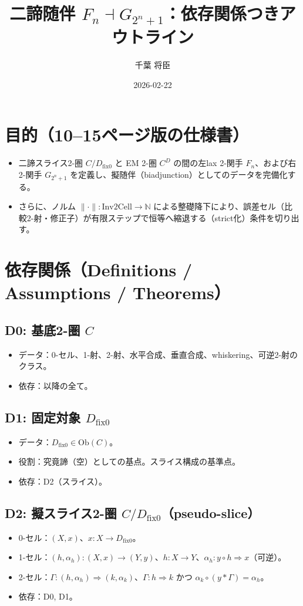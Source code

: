 \documentclass[a4paper,11pt]{article}
\title{二諦随伴 \texorpdfstring{$F_n \dashv G_{2^n+1}$}{Fn dashv G(2^n+1)}：依存関係つきアウトライン}
\author{千葉 将臣}
\date{2026-02-22}
\begin{document}
\maketitle

\section*{目的（10--15ページ版の仕様書）}
\begin{itemize}
  \item 二諦スライス2-圏 $C/D_{\mathrm{fix}0}$ と EM 2-圏 $C^D$ の間の左lax 2-関手 $F_n$、および右2-関手 $G_{2^n+1}$ を定義し、擬随伴（biadjunction）としてのデータを完備化する。
  \item さらに、ノルム $\|\cdot\|:\mathrm{Inv2Cell}\to\mathbb{N}$ による整礎降下により、誤差セル（比較2-射・修正子）が有限ステップで恒等へ縮退する（strict化）条件を切り出す。
\end{itemize}

\section*{依存関係（Definitions / Assumptions / Theorems）}
\subsection*{D0: 基底2-圏 $C$}
\begin{itemize}
  \item データ：0-セル、1-射、2-射、水平合成、垂直合成、whiskering、可逆2-射のクラス。
  \item 依存：以降の全て。
\end{itemize}

\subsection*{D1: 固定対象 $D_{\mathrm{fix}0}$}
\begin{itemize}
  \item データ：$D_{\mathrm{fix}0}\in \mathrm{Ob}(C)$。
  \item 役割：究竟諦（空）としての基点。スライス構成の基準点。
  \item 依存：D2（スライス）。
\end{itemize}

\subsection*{D2: 擬スライス2-圏 $C/D_{\mathrm{fix}0}$（pseudo-slice）}
\begin{itemize}
  \item 0-セル：$(X,x)$、$x:X\to D_{\mathrm{fix}0}$。
  \item 1-セル：$(h,\alpha_h):(X,x)\to(Y,y)$、$h:X\to Y$、$\alpha_h:y\circ h \Rightarrow x$（可逆）。
  \item 2-セル：$\Gamma:(h,\alpha_h)\Rightarrow(k,\alpha_k)$、$\Gamma:h\Rightarrow k$ かつ $\alpha_k\circ(y*\Gamma)=\alpha_h$。
  \item 依存：D0, D1。
\end{itemize}
\end{document}
